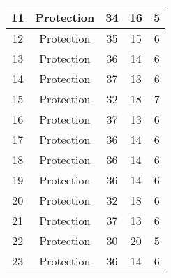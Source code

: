 \documentclass[results.tex]{subfiles}
\begin{document}
\begin{center}
\begin{tabular}{| c || c | c | c | c |}
            \hline
            11                      & Protection                   & 34                     & 16                      & 5                    \\
            \hline
            12                      & Protection                   & 35                     & 15                      & 6                    \\
            \hline
            13                      & Protection                   & 36                     & 14                      & 6                    \\
            \hline
            14                      & Protection                   & 37                     & 13                      & 6                    \\
            \hline
            15                      & Protection                   & 32                     & 18                      & 7                    \\
            \hline
            16                      & Protection                   & 37                     & 13                      & 6                    \\
            \hline
            17                      & Protection                   & 36                     & 14                      & 6                    \\
            \hline
            18                      & Protection                   & 36                     & 14                      & 6                    \\
            \hline
            19                      & Protection                   & 36                     & 14                      & 6                    \\
            \hline
            20                      & Protection                   & 32                     & 18                      & 6                    \\
            \hline
            21                      & Protection                   & 37                     & 13                      & 6                    \\
            \hline
            22                      & Protection                   & 30                     & 20                      & 5                    \\
            \hline
            23                      & Protection                   & 36                     & 14                      & 6                    \\

\end{tabular}
\end{center}
\end{document}
